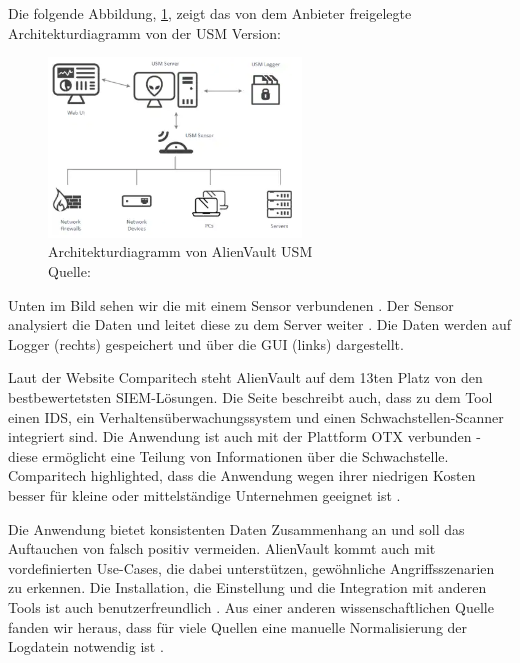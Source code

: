 Die folgende Abbildung, \ref{fig:AlienVault_Architektur}, zeigt das von dem Anbieter freigelegte Architekturdiagramm von der \gls{USM} Version:

\begin{figure}[H]
   \centering
   \includegraphics[width=0.6\textwidth]{assets/2_p6.png}
   \caption[Architekturdiagramm von AlienVault \gls{USM}]
   {Architekturdiagramm von AlienVault \gls{USM} \\Quelle: \citep{ATT_AVO} }
   \label{fig:AlienVault_Architektur}
   \centering
\end{figure}

Unten im Bild sehen wir die mit einem Sensor verbundenen . Der Sensor analysiert die Daten und leitet diese zu dem Server weiter \citep{AV_Sensor}. Die Daten werden auf Logger (rechts) gespeichert und über die \gls{GUI} (links) dargestellt. 

Laut der Website Comparitech steht AlienVault auf dem 13ten Platz von den bestbewertetsten \gls{SIEM}-Lösungen. Die Seite beschreibt auch, dass zu dem Tool einen \gls{IDS}, ein Verhaltensüberwachungssystem und einen Schwachstellen-Scanner integriert sind. Die Anwendung ist auch mit der Plattform \gls{OTX} verbunden - diese ermöglicht eine Teilung von Informationen über die Schwachstelle. Comparitech highlighted, dass die Anwendung wegen ihrer niedrigen Kosten besser für kleine oder mittelständige Unternehmen geeignet ist \citep{comparitech_SIEM}. 

Die Anwendung bietet konsistenten Daten Zusammenhang an und soll das Auftauchen von \gls{falsch positiv} vermeiden. AlienVault kommt auch mit vordefinierten Use-Cases, die dabei unterstützen, gewöhnliche Angriffsszenarien zu erkennen. Die Installation, die Einstellung und die Integration mit anderen Tools ist auch benutzerfreundlich \citep{Gomes_AV}. Aus einer anderen wissenschaftlichen Quelle fanden wir heraus, dass für viele Quellen eine manuelle Normalisierung der Logdatein notwendig ist \citep{Nabil_AV}.


